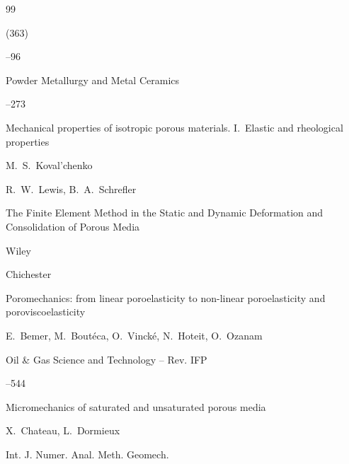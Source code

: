 \begin{thebibliography}{99}

(363)

--96

\transl

\jour Powder Metallurgy and Metal Ceramics




--273

\paper Mechanical properties of isotropic porous materials. I.~Elastic and rheological properties

\by M.~S.~Koval'chenko 









\by  R.~W.~Lewis, B.~A.~Schrefler

\book  The Finite Element Method in the Static and Dynamic Deformation and Consolidation of Porous Media

\publ Wiley 

\publaddr Chichester





\paper Poromechanics: from linear poroelasticity to non-linear poroelasticity and poroviscoelasticity

\by E.~Bemer, M.~Bout\'eca, O.~Vinck\'e, N.~Hoteit, O.~Ozanam

\jour Oil \& Gas Science and Technology -- Rev. IFP




--544





\paper Micromechanics of saturated and unsaturated porous media

\by X.~Chateau, L.~Dormieux

\jour Int. J. Numer. Anal. Meth. Geomech.





\end{thebibliography}
